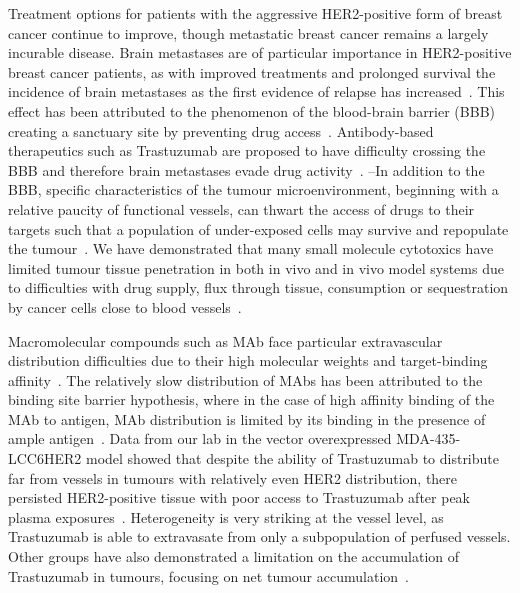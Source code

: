 Treatment options for patients with the aggressive \acs{HER2}-positive form of breast cancer continue to improve, though metastatic breast cancer remains a largely incurable disease.
Brain metastases are of particular importance in \acs{HER2}-positive breast cancer patients, as with improved treatments and prolonged survival the incidence of brain metastases as the first evidence of relapse has increased~\cite{Seal:2012cn,Bria:2007gc}.
This effect has been attributed to the phenomenon of the blood-brain barrier (\acs{BBB}) creating a sanctuary site by preventing drug access~\cite{Kaplan:2014es,Lai:2004bd}.
Antibody-based therapeutics such as Trastuzumab are proposed to have difficulty crossing the \acs{BBB} and therefore brain metastases evade drug activity~\cite{Seal:2012cn,Murrell:2015bz,Stemmler:2006}.
--In addition to the \acs{BBB}, specific characteristics of the tumour microenvironment, beginning with a relative paucity of functional vessels, can thwart the access of drugs to their targets such that a population of under-exposed cells may survive and repopulate the tumour~\cite{Minchinton:2006gs}.
We have demonstrated that many small molecule cytotoxics have limited tumour tissue penetration in both in vivo and in vivo model systems due to difficulties with drug supply, flux through tissue, consumption or sequestration by cancer cells close to blood vessels~\cite{Kyle:2014cy,Kyle:2007ch,Huxham:2004hm,Kyle:2004fo,Kyle:1999kr}.

Macromolecular compounds such as \acs{MAb} face particular extravascular distribution difficulties due to their high molecular weights and target-binding affinity~\cite{Jain:2010ie,Chauhan:2011fi}.
The relatively slow distribution of \acs{MAbs} has been attributed to the binding site barrier hypothesis, where in the case of high affinity binding of the \acs{MAb} to antigen, \acs{MAb} distribution is limited by its binding in the presence of ample antigen~\cite{Juweid:1992ty}.
Data from our lab in the vector overexpressed MDA-435-LCC6\acs{HER2} model showed that despite the ability of Trastuzumab to distribute far from vessels in tumours with relatively even \acs{HER2} distribution, there persisted \acs{HER2}-positive tissue with poor access to Trastuzumab after peak plasma exposures~\cite{Baker:2008ci}.
Heterogeneity is very striking at the vessel level, as Trastuzumab is able to extravasate from only a subpopulation of perfused vessels.
Other groups have also demonstrated a limitation on the accumulation of Trastuzumab in tumours, focusing on net tumour accumulation~\cite{Jain:2010ie,Chauhan:2011fi,Lee:2010gb}.

